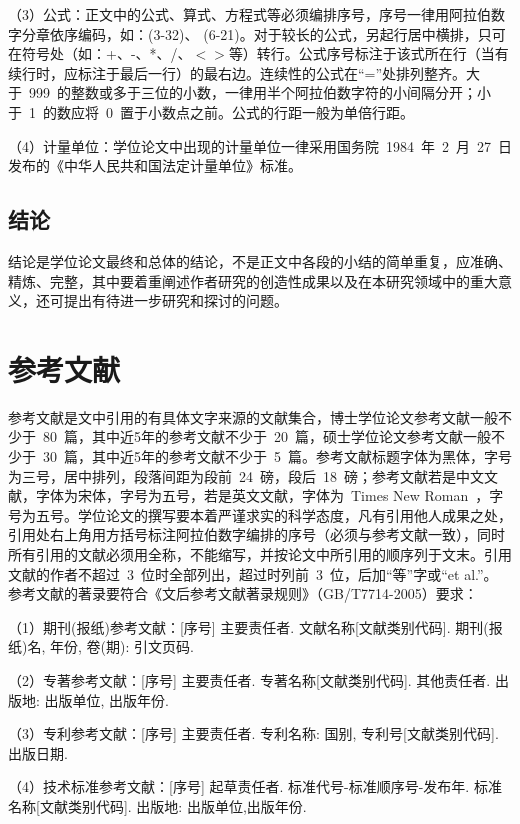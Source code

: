 （3）公式：正文中的公式、算式、方程式等必须编排序号，序号一律用阿拉伯数字分章依序编码，如：(3-32)、 (6-21)。对于较长的公式，另起行居中横排，只可在符号处（如：+、-、*、/、$<$$>$等）转行。公式序号标注于该式所在行（当有续行时，应标注于最后一行）的最右边。连续性的公式在“=”处排列整齐。大于~999~的整数或多于三位的小数，一律用半个阿拉伯数字符的小间隔分开；小于~1~的数应将~0~置于小数点之前。公式的行距一般为单倍行距。

（4）计量单位：学位论文中出现的计量单位一律采用国务院~1984~年~2~月~27~日发布的《中华人民共和国法定计量单位》标准。

\subsection{结论}

结论是学位论文最终和总体的结论，不是正文中各段的小结的简单重复，应准确、精炼、完整，其中要着重阐述作者研究的创造性成果以及在本研究领域中的重大意义，还可提出有待进一步研究和探讨的问题。

\section{参考文献}

参考文献是文中引用的有具体文字来源的文献集合，博士学位论文参考文献一般不少于~80~篇，其中近5年的参考文献不少于~20~篇，硕士学位论文参考文献一般不少于~30~篇，其中近5年的参考文献不少于~5~篇。参考文献标题字体为黑体，字号为三号，居中排列，段落间距为段前~24~磅，段后~18~磅；参考文献若是中文文献，字体为宋体，字号为五号，若是英文文献，字体为~Times New Roman~，字号为五号。学位论文的撰写要本着严谨求实的科学态度，凡有引用他人成果之处，引用处右上角用方括号标注阿拉伯数字编排的序号（必须与参考文献一致），同时所有引用的文献必须用全称，不能缩写，并按论文中所引用的顺序列于文末。引用文献的作者不超过~3~位时全部列出，超过时列前~3~位，后加“等”字或“et al.”。 参考文献的著录要符合《文后参考文献著录规则》（GB/T7714-2005）要求：

（1）期刊(报纸)参考文献：[序号] 主要责任者. 文献名称[文献类别代码]. 期刊(报纸)名, 年份, 卷(期): 引文页码.

（2）专著参考文献：[序号] 主要责任者. 专著名称[文献类别代码]. 其他责任者. 出版地: 出版单位, 出版年份.

（3）专利参考文献：[序号] 主要责任者. 专利名称: 国别, 专利号[文献类别代码]. 出版日期.

（4）技术标准参考文献：[序号] 起草责任者. 标准代号-标准顺序号-发布年. 标准名称[文献类别代码]. 出版地: 出版单位,出版年份.

